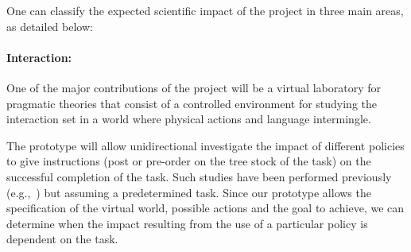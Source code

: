 

One can classify the expected scientific impact of the project in three main
areas, as detailed below:


\paragraph{Interaction:}
One of the major contributions of the project will be a virtual laboratory for
pragmatic theories that consist of a controlled environment for studying the
interaction set in a world where physical actions and language intermingle.


The prototype will allow unidirectional investigate the impact of different
policies to give instructions (post or pre-order on the tree stock of the task)
on the successful completion of the task. Such studies have been performed
previously (e.g.,~\cite{foster-etal-ijcai2009}) but assuming a predetermined
task. Since our prototype allows the specification of the virtual world,
possible actions and the goal to achieve, we can determine when the impact
resulting from the use of a particular policy is dependent on the task.


